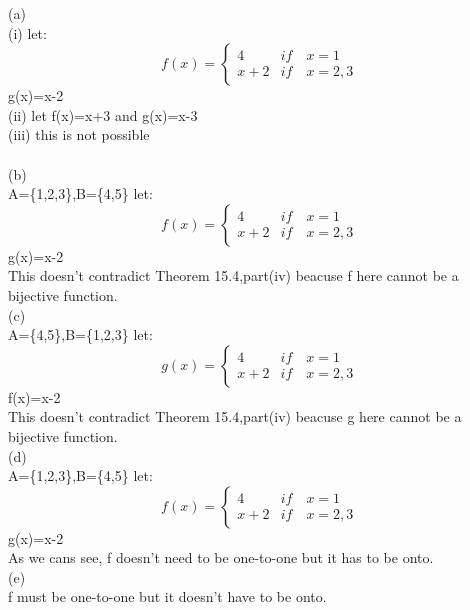 \documentclass[11pt, a4paper, UTF8]{ctexart}
\begin{document}
\begin{solution}
(a)\\
(i) let:
\[f(x)= \begin{cases}
4 & if\quad x= 1\\
x+2 & if\quad x=2,3
\end{cases}\]
g(x)=x-2\\
(ii) let f(x)=x+3 and g(x)=x-3\\
(iii) this is not possible\\
\\
(b)\\
A=\{1,2,3\},B=\{4,5\}
 let:
\[f(x)= \begin{cases}
4 & if\quad x= 1\\
x+2 & if\quad x=2,3
\end{cases}\]
g(x)=x-2\\
This doesn't contradict Theorem 15.4,part(iv) beacuse f here cannot be a bijective function.\\
(c)\\
A=\{4,5\},B=\{1,2,3\}
 let:
\[g(x)= \begin{cases}
4 & if\quad x= 1\\
x+2 & if\quad x=2,3
\end{cases}\]
f(x)=x-2\\
This doesn't contradict Theorem 15.4,part(iv) beacuse g here cannot be a bijective function.\\
(d)\\
A=\{1,2,3\},B=\{4,5\}
 let:
\[f(x)= \begin{cases}
4 & if\quad x= 1\\
x+2 & if\quad x=2,3
\end{cases}\]
g(x)=x-2\\
As we cans see, f doesn't need to be one-to-one but it has to be onto.\\
(e)\\
f must be one-to-one but it doesn't have to be onto.

\end{solution}
\end{document}
